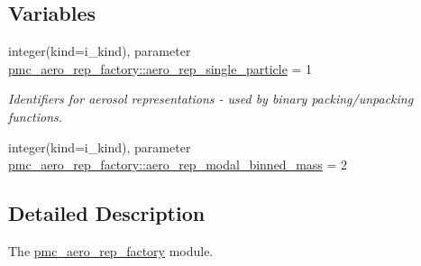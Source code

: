 \subsection*{Variables}
\begin{DoxyCompactItemize}
\item 
integer(kind=i\+\_\+kind), parameter \mbox{\hyperlink{namespacepmc__aero__rep__factory_aa1580bb537129ddd255b271666133c84}{pmc\+\_\+aero\+\_\+rep\+\_\+factory\+::aero\+\_\+rep\+\_\+single\+\_\+particle}} = 1
\begin{DoxyCompactList}\small\item\em Identifiers for aerosol representations -\/ used by binary packing/unpacking functions. \end{DoxyCompactList}\item 
integer(kind=i\+\_\+kind), parameter \mbox{\hyperlink{namespacepmc__aero__rep__factory_a26fa93012c30cd32b47383811765e08b}{pmc\+\_\+aero\+\_\+rep\+\_\+factory\+::aero\+\_\+rep\+\_\+modal\+\_\+binned\+\_\+mass}} = 2
\end{DoxyCompactItemize}


\subsection{Detailed Description}
The \mbox{\hyperlink{namespacepmc__aero__rep__factory}{pmc\+\_\+aero\+\_\+rep\+\_\+factory}} module. 

